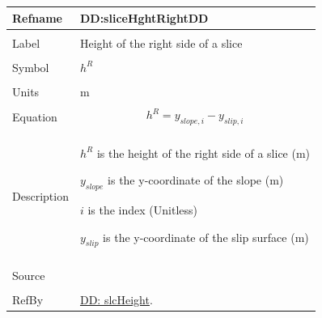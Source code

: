 \documentclass[12pt]{article}
\begin{document}
\noindent \begin{minipage}{\textwidth}
\begin{tabular}{p{} p{}}
\toprule \textbf{Refname} & \textbf{DD:sliceHghtRightDD}
\label{DD:sliceHghtRightDD}
\\ \midrule \\
Label & Height of the right side of a slice
        \\ \midrule \\
        Symbol & ${h^{R}}$
                 \\ \midrule \\
                 Units & m
                         \\ \midrule \\
                         Equation & \begin{displaymath}
                                    {h^{R}}={y_{slope,i}}-{y_{slip,i}}
                                    \end{displaymath}
                                    \\ \midrule \\
                                    Description & \begin{symbDescription}
                                                  \item{${h^{R}}$ is the height of the right side of a slice (m)}
                                                  \item{${y_{slope}}$ is the y-coordinate of the slope (m)}
                                                  \item{$i$ is the index (Unitless)}
                                                  \item{${y_{slip}}$ is the y-coordinate of the slip surface (m)}
                                                  \end{symbDescription}
                                                  \\ \midrule \\
                                                  Source & \\ \midrule \\
                                                           RefBy & \hyperref[DD:slcHeight]{DD: slcHeight}.
\\ \bottomrule \end{tabular}
\end{minipage}
\par~
\end{document}
